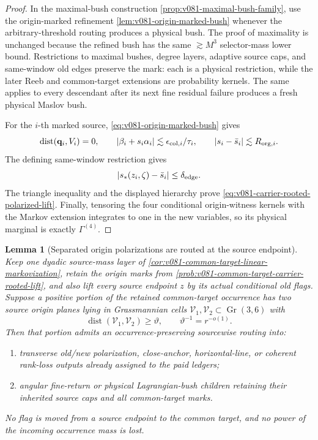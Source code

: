 \documentclass[10pt]{article}
\newtheorem{lemma}[theorem]{Lemma}
\newcommand{\dist}{\operatorname{dist}}
\newcommand{\Gr}{\operatorname{Gr}}
\begin{document}
\begin{proof}
In the maximal-bush construction
\cref{prop:v081-maximal-bush-family}, use the origin-marked refinement
\cref{lem:v081-origin-marked-bush} whenever the arbitrary-threshold routing produces a physical
bush.  The proof of maximality is unchanged because the refined bush has the same
\(\gtrsim M^3\) selector-mass lower bound.  Restrictions to maximal bushes, degree layers, adaptive
source caps, and same-window old edges preserve the mark: each is a physical restriction, while
the later Reeb and common-target extensions are probability kernels.  The same applies to every
descendant after its next fine residual failure produces a fresh physical Maslov bush.

For the \(i\)-th marked source,
\eqref{eq:v081-origin-marked-bush} gives
\[
\dist(\mathbf q_i,V_i)=0,
\qquad
|\beta_i+s_i\alpha_i|
\lesssim
\epsilon_{{\rm col},i}/\tau_i,
\qquad
|s_i-\bar s_i|
\lesssim
R_{{\rm org},i}.
\]
The defining same-window restriction gives
\[
|s_*(z_i,\zeta)-\bar s_i|\le\delta_{\rm edge}.
\]
The triangle inequality and the displayed hierarchy prove
\eqref{eq:v081-carrier-rooted-polarized-lift}.  Finally, tensoring the four conditional
origin-witness kernels with the Markov extension integrates to one in the new variables, so its
physical marginal is exactly \(\Gamma^{(4)}\).
\end{proof}

\begin{lemma}[Separated origin polarizations are routed at the source endpoint]
\label{lem:v081-common-target-source-polarization-cycle}
Keep one dyadic source-mass layer of
\cref{cor:v081-common-target-linear-markovization}, retain the origin marks from
\cref{prob:v081-common-target-carrier-rooted-lift}, and also lift every source endpoint \(z\) by its
actual conditional old flags.  Suppose a positive portion of the retained common-target occurrence
has two source origin planes lying in Grassmannian cells
\(\mathcal V_1,\mathcal V_2\subset\Gr(3,6)\) with
\[
\dist(\mathcal V_1,\mathcal V_2)\ge\vartheta,
\qquad
\vartheta^{-1}=r^{-o(1)}.
\]
Then that portion admits an occurrence-preserving sourcewise routing into:
\begin{enumerate}[label=\textnormal{(\roman*)}]
\item transverse old/new polarization, close-anchor, horizontal-line, or coherent rank-loss
outputs already assigned to the paid ledgers;
\item angular fine-return or physical Lagrangian-bush children retaining their inherited source
caps and all common-target marks.
\end{enumerate}
No flag is moved from a source endpoint to the common target, and no power of the incoming
occurrence mass is lost.
\end{lemma}
\end{document}
